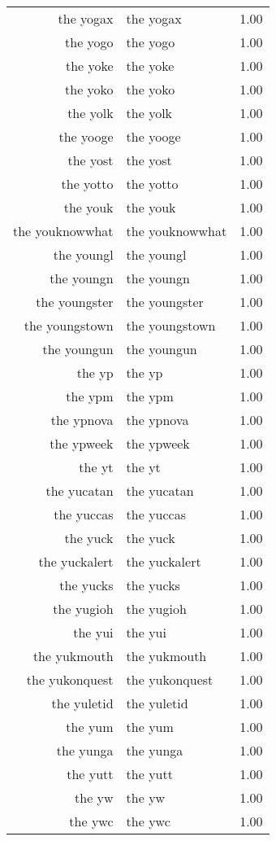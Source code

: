 \begin{table}[ht]
\begin{tabular}{rlr}
  the yogax & the yogax & 1.00 \\ 
  the yogo & the yogo & 1.00 \\ 
  the yoke & the yoke & 1.00 \\ 
  the yoko & the yoko & 1.00 \\ 
  the yolk & the yolk & 1.00 \\ 
  the yooge & the yooge & 1.00 \\ 
  the yost & the yost & 1.00 \\ 
  the yotto & the yotto & 1.00 \\ 
  the youk & the youk & 1.00 \\ 
  the youknowwhat & the youknowwhat & 1.00 \\ 
  the youngl & the youngl & 1.00 \\ 
  the youngn & the youngn & 1.00 \\ 
  the youngster & the youngster & 1.00 \\ 
  the youngstown & the youngstown & 1.00 \\ 
  the youngun & the youngun & 1.00 \\ 
  the yp & the yp & 1.00 \\ 
  the ypm & the ypm & 1.00 \\ 
  the ypnova & the ypnova & 1.00 \\ 
  the ypweek & the ypweek & 1.00 \\ 
  the yt & the yt & 1.00 \\ 
  the yucatan & the yucatan & 1.00 \\ 
  the yuccas & the yuccas & 1.00 \\ 
  the yuck & the yuck & 1.00 \\ 
  the yuckalert & the yuckalert & 1.00 \\ 
  the yucks & the yucks & 1.00 \\ 
  the yugioh & the yugioh & 1.00 \\ 
  the yui & the yui & 1.00 \\ 
  the yukmouth & the yukmouth & 1.00 \\ 
  the yukonquest & the yukonquest & 1.00 \\ 
  the yuletid & the yuletid & 1.00 \\ 
  the yum & the yum & 1.00 \\ 
  the yunga & the yunga & 1.00 \\ 
  the yutt & the yutt & 1.00 \\ 
  the yw & the yw & 1.00 \\ 
  the ywc & the ywc & 1.00 \\ 

\end{tabular}
\end{table}
